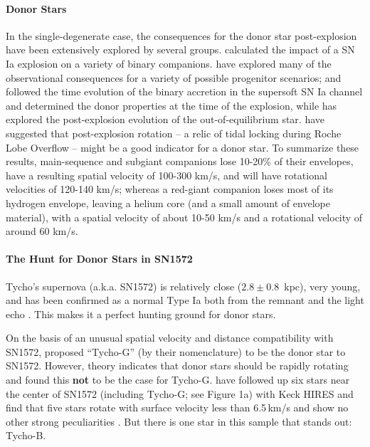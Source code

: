 \documentclass[12pt]{article}
\begin{document}
\paragraph{Donor Stars}
In the single-degenerate case, the consequences for the donor star post-explosion have been extensively explored by several groups. \citet{2000ApJS..128..615M} calculated the impact of a SN Ia explosion on a variety of binary companions. \citet{2001ApJ...550L..53C} have explored many of the observational consequences for a variety of possible progenitor scenarios; \citet{2004MNRAS.350.1301H} and \citet{Han:2008p726} followed the time evolution of the binary accretion in the supersoft SN Ia channel and determined the donor properties at the time of the explosion, while \citet{2003astro.ph..3660P} has explored the post-explosion evolution of the out-of-equilibrium star. \citet{2009ApJ...701.1665K} have suggested that post-explosion rotation -- a relic of tidal locking during Roche Lobe Overflow -- might be a good indicator for a donor star. 
To summarize these results, main-sequence and subgiant companions lose 10-20\% of their envelopes,  have a resulting spatial velocity of 100-300 km/s, and will have rotational velocities of 120-140 km/s; whereas a red-giant companion loses most of its hydrogen envelope, leaving a helium core (and a small amount of envelope material), with a spatial velocity of about 10-50 km/s and a rotational velocity of around 60 km/s.

\vspace{-5mm}
\paragraph{The Hunt for Donor Stars in SN1572}
Tycho's supernova (a.k.a. SN1572) is relatively close ($2.8\pm0.8$~kpc), very young, and has been confirmed as a normal Type Ia both from the remnant \citep{2006ApJ...645.1373B} and the light echo \citep{2008ApJ...681L..81R,2008Natur.456..617K}. This makes it a perfect hunting ground for donor stars.

On the basis of an unusual spatial velocity and distance compatibility with SN1572, \citet{2004Natur.431.1069R} proposed ``Tycho-G'' (by their nomenclature) to be the donor star to SN1572.  However, theory indicates that donor stars should be rapidly rotating and \citet{2009ApJ...701.1665K} found this {\bf not} to be the case for Tycho-G. \citet{2012arXiv1210.2713K} have followed up six stars  near the center of SN1572 (including Tycho-G; see Figure 1a) with Keck HIRES  and find that five stars rotate with surface velocity less than 6.5\,km/s and show no other strong peculiarities . But there is one star in this sample that stands out: Tycho-B.
\end{document}
